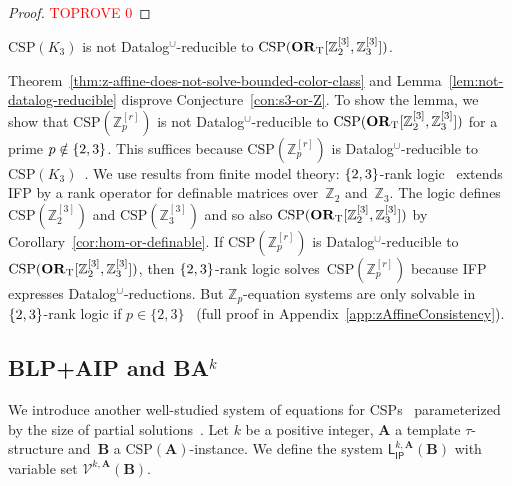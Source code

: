\documentclass[a4paper,english, thm-restate]{lipics-v2021}
\newcommand{\ZZ}{\mathbb{Z}}
\DeclarePairedDelimiter\set{\lbrace}{\rbrace}
\newcommand{\sig}{\tau}
\newcommand{\StructA}{\mathbf{A}}
\newcommand{\StructB}{\mathbf{B}}
\newcommand{\CSP}[1]{\mathrm{CSP}(#1)}
\newcommand{\leqs}{\mathsf{L}}
\newcommand{\ipk}[3]{\leqs^{#1,#2}_{\mathsf{IP}} (#3)}
\newcommand{\CosetGrpTmplt}[2]{#1^{[#2]}}
\begin{document}
	\begin{proof}\textcolor{red}{TOPROVE 0}\end{proof}
\begin{lemma}[restate=notDatalogReducible, name =]
		\label{lem:not-datalog-reducible}
		$\CSP{K_3}$ is not Datalog$^\cup$-reducible to $\CSP{\ZtwoOrThreeInst}$.
	\end{lemma}
	\noindent
	Theorem~\ref{thm:z-affine-does-not-solve-bounded-color-class}
	and Lemma~\ref{lem:not-datalog-reducible}
	disprove Conjecture~\ref{con:s3-or-Z}.
	To show the lemma, we show that $\CSP{\CosetGrpTmplt{\ZZ_p}{r}}$ is not Datalog$^\cup$-reducible to $\CSP{\ZtwoOrThreeInst}$ for a prime $p \notin\set{2,3}$.
	This suffices because $\CSP{\CosetGrpTmplt{\ZZ_p}{r}}$ is Datalog$^\cup$-reducible to $\CSP{K_3}$~\cite{DalmauOprsal2024}.
	We use results from finite model theory:
	$\set{2,3}$-rank logic~\cite{DawarGHL09}
	extends IFP by a rank operator for definable matrices over~$\ZZ_2$ and~$\ZZ_3$.
	The logic defines $\CSP{\CosetGrpTmplt{\ZZ_2}{3}}$ and $\CSP{\CosetGrpTmplt{\ZZ_3}{3}}$
	and so also $\CSP{\ZtwoOrThreeInst}$ by Corollary~\ref{cor:hom-or-definable}.
	If $\CSP{\CosetGrpTmplt{\ZZ_p}{r}}$ is Datalog$^\cup$-reducible to 
	$\CSP{\ZtwoOrThreeInst}$,  
	then $\set{2,3}$-rank logic solves~$\CSP{\CosetGrpTmplt{\ZZ_p}{r}}$ because IFP expresses Datalog$^\cup$-reductions. But $\ZZ_p$-equation systems are only solvable in $\set{2,3}$-rank logic if $p \in \{2,3\}$~\cite{GradelPakusa19} (full proof in Appendix~\ref{app:zAffineConsistency}).
	
	
	
	
	\newcommand{\BLPAIP}[1]{\mathsf{BLP{+}AIP}(#1)}
	\newcommand{\BAk}[2]{\mathsf{BA}^{#1}(#2)}
	\newcommand{\VarsIP}[3]{\mathcal{V}^{#1,#2}(#3)}
	\subsection{BLP+AIP and BA\texorpdfstring{$^k$}{k}}
	\label{sec:BLP}
	We introduce another well-studied system of equations for CSPs~\cite{BartoBKO2021,BrakensiekGWZ2020} parameterized by the size of partial solutions~\cite{CiardoZivny2023GraphColoring}.
	Let $k$ be a positive integer, $\StructA$ a template $\sig$-structure
	and~$\StructB$ a $\CSP{\StructA}$-instance.
	We define the system
	$\ipk{k}{\StructA}{\StructB}$ with variable set $\VarsIP{k}{\StructA}{\StructB}$.
	
\end{document}
